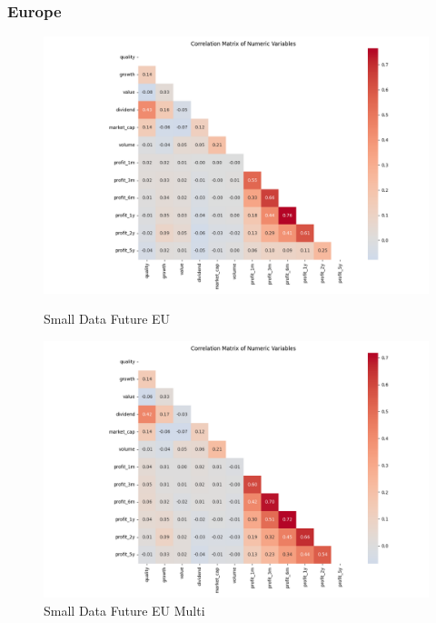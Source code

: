 \documentclass[11pt,english,a4paper,hidelinks]{book}
\begin{document}
\subsubsection{Europe}
\begin{figure}[H]
    \centering
    \begin{minipage}{0.48\textwidth}
        \centering
        \includegraphics[width=\linewidth]{images/code/descriptive analysis/correlations/Small Data future EU.png}
        \caption{Small Data Future EU}
        \label{fig:small_data_future_eu_correlations}
    \end{minipage}
    \begin{minipage}{0.48\textwidth}
        \centering
        \includegraphics[width=\linewidth]{images/code/descriptive analysis/correlations/Small Data future EU - Multi.png}
        \caption{Small Data Future EU Multi}
        \label{fig:small_data_future_eu_multi_correlations}
    \end{minipage}
\end{figure}
\end{document}
